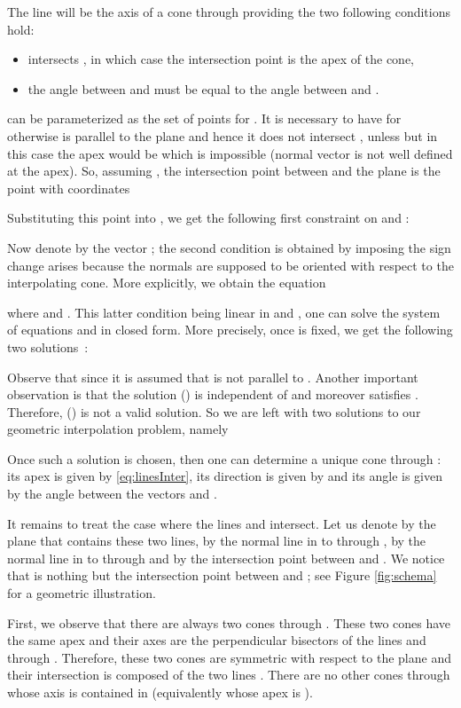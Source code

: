 \documentclass[5p]{elsarticle}
\newcommand{\com}[1]{{\color{black} #1}}
\begin{document}
The line  will be the axis of a cone through  providing the two following conditions hold: 
\begin{itemize}
	\item  \com{intersects} , in which case the intersection point is the apex of the cone,
	\item the angle between  and  must be equal to the angle between  and .
\end{itemize}
 can be parameterized as the set of points  for . It is necessary to have  for otherwise  is parallel to the plane  and hence it does not intersect , unless  but in this case the apex would be  which is impossible (normal vector is not well defined at the apex). So, assuming , the intersection point between  and the plane  is the \com{point with} coordinates

\com{Substituting this point into , we} get the following first constraint on  and  : 

\com{Now denote} by  the vector \com{;} the second condition is obtained by imposing 
 the sign change \com{arises because} the normals are supposed to be oriented with respect to the interpolating cone. More explicitly, we obtain the equation

where  and . 
This latter condition being linear in  and , one can solve the system of equations  and  in closed form. More precisely, once  is fixed, we get the \com{following two} solutions~:  
  
Observe that  since it is assumed that  is not parallel to . Another important observation is that the solution () is independent of  and  moreover satisfies . Therefore, \com{()} is not a valid solution. \com{So we} are left with two solutions to our geometric interpolation problem, namely 
 
Once such a solution is chosen, then one can determine a unique cone through  : its apex is given by \eqref{eq:linesInter}, its direction is given by  and its angle is given by the angle between the vectors  and .



\medskip

It remains to treat the case where the lines  and  intersect. Let us denote by  the plane that contains these two lines, by  the normal line in  to  through , by  the normal line in  to  through  and by  the intersection point between  and . We notice that  is nothing but the intersection point between  and ; see Figure \ref{fig:schema} for a geometric illustration.

First, we observe that there are always two cones throu\-gh . These two cones have the same apex  and their \com{axes} are the perpendicular bisectors of the lines  and  through . Therefore, these two cones are symmetric with respect to the plane  and their intersection is composed of the two lines . \com{There are} no other cones through  \com{whose} axis is contained in  (equivalently whose apex is ).
\end{document}

